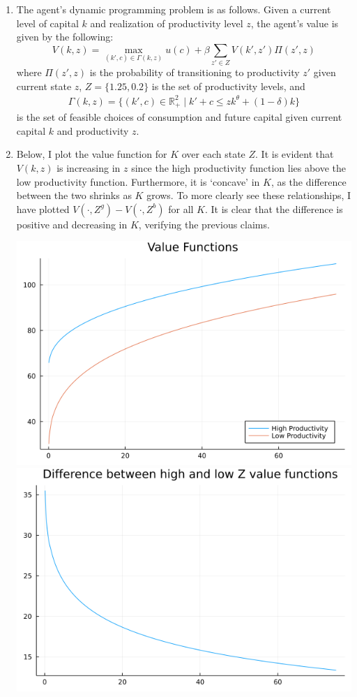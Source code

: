 \documentclass[12pt]{article}
\begin{document}
\begin{enumerate}
	\item The agent's dynamic programming problem is as follows. Given a current level of capital $k$ and realization of productivity level $z$, the agent's value is given by the following:
	\[V(k, z) = \max_{(k', c) \in \Gamma(k,z)} u(c) + \beta \sum_{z' \in Z} V(k', z') \Pi(z', z)\]
	where $\Pi(z',z)$ is the probability of transitioning to productivity $z'$ given current state $z$, $Z = \{1.25, 0.2\}$ is the set of productivity levels, and
	\begin{align*}\Gamma(k,z) = \{(k', c) \in \mathbb{R}^2_+ \mid k' + c \leq z k^{\theta} + (1-\delta) k\}
	\end{align*}
	is the set of feasible choices of consumption and future capital given current capital $k$ and productivity $z$.
    \item Below, I plot the value function for $K$ over each state $Z$. It is evident that $V(k, z)$ is increasing in $z$ since the high productivity function lies above the low productivity function. Furthermore, it is `concave' in $K$, as the difference between the two shrinks as $K$ grows. To more clearly see these relationships, I have plotted $V(\cdot, Z^g) - V(\cdot, Z^b)$ for all $K$. It is clear that the difference is positive and decreasing in $K$, verifying the previous claims.
    \begin{center}
        \includegraphics[scale=0.4]{vfplot.png}\\
        \includegraphics[scale=0.4]{netvfplot.png}

\end{center}
\end{enumerate}
\end{document}
